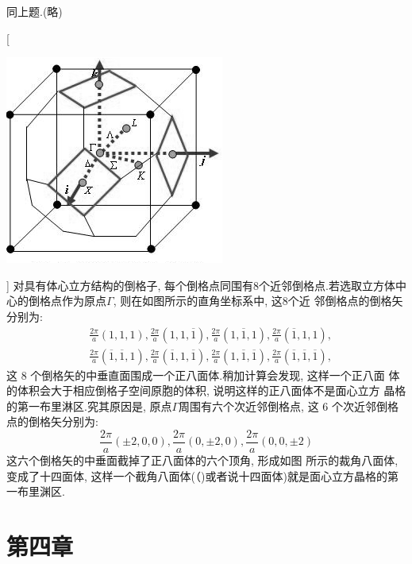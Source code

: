 \documentclass[UTF8,12pt, a4paper, oneside]{ctexart}
\begin{document}
    {同上题.(略)}

    [ \begin{center}
        \includegraphics{picture/3-12.png}
    \end{center}]
    {对具有体心立方结构的倒格子, 每个倒格点同围有8个近邻倒格点.若选取立方体中心的倒格点作为原点$\Gamma$, 则在如图所示的直角坐标系中, 这8个近 邻倒格点的倒格矢分别为:
        \[\begin{aligned}
            &\frac{2 \pi}{a}(1,1,1), \frac{2 \pi}{a}(1,1, \overline{1}), \frac{2 \pi}{a}(1, \overline{1}, 1), \frac{2 \pi}{a}(\overline{1}, 1,1), \\
            &\frac{2 \pi}{a}(\overline{1}, \overline{1}, 1), \frac{2 \pi}{a}(\overline{1}, 1, \overline{1}), \frac{2 \pi}{a}(1, \overline{1}, \overline{1}), \frac{2 \pi}{a}(\overline{1}, \overline{1}, \overline{1}),
            \end{aligned}\]这 8 个倒格矢的中垂直面围成一个正八面体.稍加计算会发现, 这样一个正八面 体的体积会大于相应倒格子空间原胞的体积, 说明这样的正八面体不是面心立方 晶格的第一布里淋区.究其原因是, 原点$\Gamma$周围有六个次近邻倒格点, 这 6 个次近邻倒格点的倒格矢分别为:
            \[\frac{2 \pi}{a}(\pm 2,0,0), \frac{2 \pi}{a}(0, \pm 2,0), \frac{2 \pi}{a}(0,0, \pm 2)\]这六个倒格矢的中垂面截掉了正八面体的六个顶角, 形成如图  所示的裁角八面体, 变成了十四面体, 这样一个截角八面体(（)或者说十四面体)就是面心立方晶格的第一布里渊区.}


\section{第四章}

\proi{}{}
\end{document}
